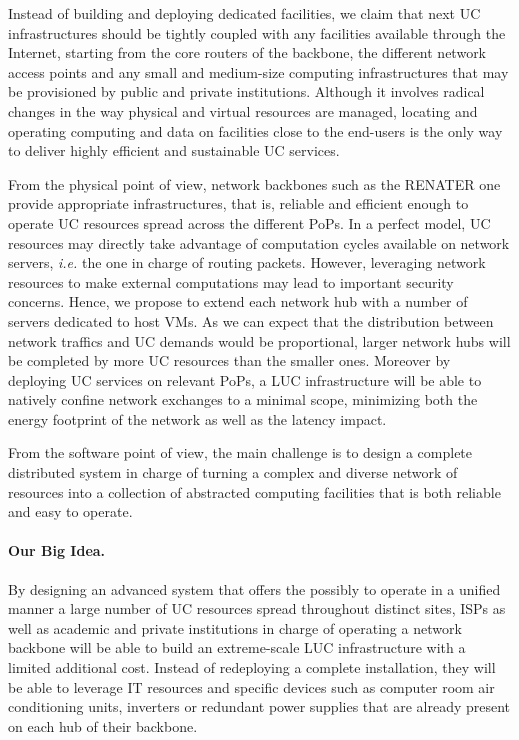 Instead of building and deploying dedicated facilities, we claim that next UC
infrastructures should be tightly coupled with any facilities available through
the Internet, starting from the core routers of the backbone, the different
network access points and any small and medium-size computing infrastructures
that may be provisioned by public and private institutions. 
 Although it involves radical changes in the way
physical and virtual resources are managed, locating and operating computing and data on
facilities close to the end-users is the only way to deliver highly efficient
and sustainable UC services. 

From the physical point of view, network backbones such as the RENATER one provide
appropriate infrastructures, that is, reliable and efficient enough to operate UC
resources spread across the different PoPs. In a perfect model, UC resources may directly
take advantage of computation cycles available on network servers, \textit{i.e.} the one
in charge of routing packets. However, leveraging network resources to make external
computations may lead to important security concerns. Hence, we propose to extend each
network hub with a number of servers dedicated to host VMs. As we can expect that the
distribution between network traffics and UC demands would be proportional, larger network
hubs will be completed by more UC resources than the smaller ones. Moreover by deploying
UC services on relevant PoPs, a LUC infrastructure will be able to natively confine
network exchanges to a minimal scope, minimizing both the energy footprint of the network
as well as the latency impact.

From the software point of view, the main challenge is to design a complete distributed
system in charge of turning a complex and diverse network of resources into a collection
of abstracted computing facilities that is both reliable and easy to operate.

\paragraph{Our Big Idea.}
By designing an advanced system that offers the possibly to operate  in a unified manner a large number of UC resources spread throughout distinct sites,
ISPs as well as academic and private institutions in
charge of operating a network backbone will be able to build an extreme-scale
LUC infrastructure with a limited additional cost. Instead of redeploying a
complete installation, they will be able to leverage IT resources and
specific devices such as computer room air conditioning units, inverters or
redundant power supplies that are already present on each hub of their
backbone. 

